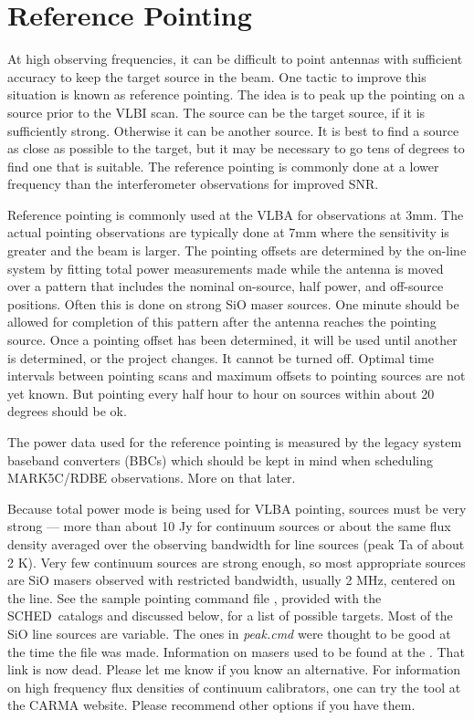 \documentclass{report}
\newcommand{\schedb}{{\sc SCHED~}}
\begin{document}
\section{\label{SEC:REFPOINT}Reference Pointing}

At high observing frequencies, it can be difficult to point antennas with
sufficient accuracy to keep the target source in the beam.  One tactic to
improve this situation is known as reference pointing.  The idea is to
peak up the pointing on a source prior to the VLBI scan.  The source can
be the target source, if it is sufficiently strong.  Otherwise it can
be another source.  It is best to find a source as close as possible
to the target, but it may be necessary to go tens of degrees to find
one that is suitable.  The reference pointing is commonly done at a
lower frequency than the interferometer observations for improved SNR.

Reference pointing is commonly used at the VLBA for observations at
3mm.  The actual pointing observations are typically done at 7mm where
the sensitivity is greater and the beam is larger.  The pointing
offsets are determined by the on-line system by fitting total power
measurements made while the antenna is moved over a pattern that
includes the nominal on-source, half power, and off-source positions.
Often this is done on strong SiO maser sources.  One minute should be
allowed for completion of this pattern after the antenna reaches the
pointing source.  Once a pointing offset has been determined, it will
be used until another is determined, or the project changes.  It
cannot be turned off.  Optimal time intervals between pointing scans
and maximum offsets to pointing sources are not yet known.  But
pointing every half hour to hour on sources within about 20 degrees
should be ok.  

The power data used for the reference pointing is measured by the
legacy system baseband converters (BBCs) which should be kept in mind
when scheduling MARK5C/RDBE observations.  More on that later.

Because total power mode is being used for VLBA pointing, sources must
be very strong --- more than about 10 Jy for continuum sources or
about the same flux density averaged over the observing bandwidth for
line sources (peak Ta of about 2 K).  Very few continuum sources are
strong enough, so most appropriate sources are SiO masers observed
with restricted bandwidth, usually 2 MHz, centered on the line.  See
the sample pointing command file , provided with the
\schedb catalogs and discussed below, for a list of possible targets.
Most of the SiO line sources are variable.  The ones in {\sl peak.cmd}
were thought to be good at the time the file was made.  Information on
masers used to be found at the .
That link is now dead.  Please let me know if you know an alternative.
For information on high frequency flux densities of continuum
calibrators, one can try the
tool at the CARMA website.  Please recommend other options if you have
them.
\end{document}
